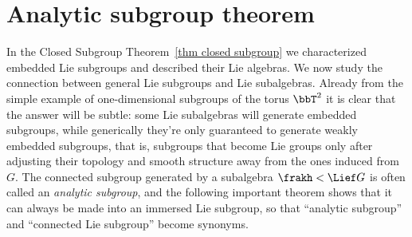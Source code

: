 \section{Analytic subgroup theorem}\label{sec: analytic subgroup theorem}

In the Closed Subgroup Theorem~\ref{thm closed subgroup} we characterized embedded Lie subgroups and described their Lie algebras. We now study the connection between general Lie subgroups and Lie subalgebras. Already from the simple example of one-dimensional subgroups of the torus $\bbT^2$ it is clear that the answer will be subtle: some Lie subalgebras will generate embedded subgroups, while generically they're only guaranteed to generate weakly embedded subgroups, that is, subgroups that become Lie groups only after adjusting their topology and smooth structure away from the ones induced from $G$. The connected subgroup generated by a subalgebra $\frakh< \Lief G$ is often called an \emph{analytic subgroup}, and the following important theorem shows that it can always be made into an immersed Lie subgroup, so that ``analytic subgroup'' and ``connected Lie subgroup'' become synonyms.


